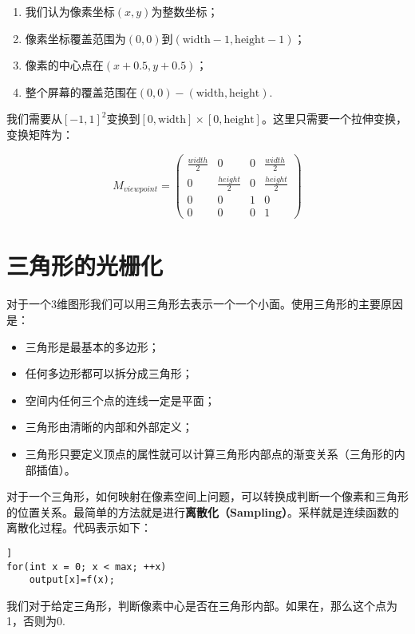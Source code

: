 \documentclass[openany]{progbookcn}
\begin{document}
\begin{enumerate}
	\item 我们认为像素坐标$(x,y)$为整数坐标；
	\item 像素坐标覆盖范围为$(0,0)$到$(\text{width}-1,\text{height}-1)$；
	\item 像素的中心点在$(x+0.5,y+0.5)$；
	\item 整个屏幕的覆盖范围在$(0,0)-(\text{width}, \text{height})$.
\end{enumerate}

我们需要从$[-1,1]^2$变换到$[0,\text{width}]\times[0,\text{height}]$。这里只需要一个拉伸变换，变换矩阵为：

\begin{equation}
	M_{viewpoint}=\begin{pmatrix}
		\frac{width}{2} &0&0&\frac{width}{2}\\
		0&\frac{height}{2}&0&\frac{height}{2}\\
		0&0&1&0\\
		0&0&0&1
	\end{pmatrix}
\end{equation}

\section{三角形的光栅化}

对于一个3维图形我们可以用三角形去表示一个一个小面。使用三角形的主要原因是：

\begin{itemize}
	\item 三角形是最基本的多边形；
	\item 任何多边形都可以拆分成三角形；
	\item 空间内任何三个点的连线一定是平面；
	\item 三角形由清晰的内部和外部定义；
	\item 三角形只要定义顶点的属性就可以计算三角形内部点的渐变关系（三角形的内部插值）。
\end{itemize}

对于一个三角形，如何映射在像素空间上问题，可以转换成判断一个像素和三角形的位置关系。最简单的方法就是进行\textbf{离散化（Sampling）}。采样就是连续函数的离散化过程。代码表示如下：

\begin{lstlisting}]
for(int x = 0; x < max; ++x)
	output[x]=f(x);
\end{lstlisting}
我们对于给定三角形，判断像素中心是否在三角形内部。如果在，那么这个点为1，否则为0.
\end{document}
